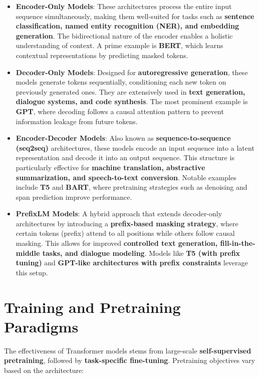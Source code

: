 \begin{itemize}
    \item \textbf{Encoder-Only Models}: These architectures process the entire input sequence simultaneously, making them well-suited for tasks such as \textbf{sentence classification, named entity recognition (NER), and embedding generation}. The bidirectional nature of the encoder enables a holistic understanding of context. A prime example is \textbf{BERT}, which learns contextual representations by predicting masked tokens.
    
    \item \textbf{Decoder-Only Models}: Designed for \textbf{autoregressive generation}, these models generate tokens sequentially, conditioning each new token on previously generated ones. They are extensively used in \textbf{text generation, dialogue systems, and code synthesis}. The most prominent example is \textbf{GPT}, where decoding follows a causal attention pattern to prevent information leakage from future tokens.

    \item \textbf{Encoder-Decoder Models}: Also known as \textbf{sequence-to-sequence (seq2seq)} architectures, these models encode an input sequence into a latent representation and decode it into an output sequence. This structure is particularly effective for \textbf{machine translation, abstractive summarization, and speech-to-text conversion}. Notable examples include \textbf{T5} and \textbf{BART}, where pretraining strategies such as denoising and span prediction improve performance.

    \item \textbf{PrefixLM Models}: A hybrid approach that extends decoder-only architectures by introducing a \textbf{prefix-based masking strategy}, where certain tokens (prefix) attend to all positions while others follow causal masking. This allows for improved \textbf{controlled text generation, fill-in-the-middle tasks, and dialogue modeling}. Models like \textbf{T5 (with prefix tuning)} and \textbf{GPT-like architectures with prefix constraints} leverage this setup.
\end{itemize}

\section{Training and Pretraining Paradigms}

The effectiveness of Transformer models stems from large-scale \textbf{self-supervised pretraining}, followed by \textbf{task-specific fine-tuning}. Pretraining objectives vary based on the architecture:

